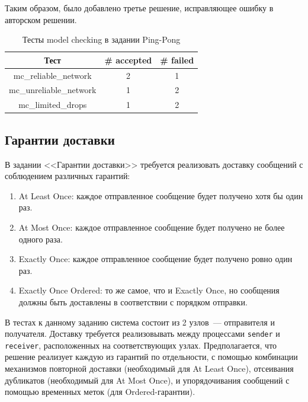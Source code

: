 \documentclass[a4paper,12pt]{extarticle}
\begin{document}
Таким образом, было добавлено третье решение, исправляющее ошибку в авторском решении.

\begin{table}[htbp]
    \caption{Тесты model checking в задании Ping-Pong}
    \begin{center}
    \begin{tabular}{|c|c|c|}
    \hline
    \textbf{Тест} & \textbf{\# accepted} & \textbf{\# failed}  \\
    \hline
    mc\_reliable\_network & 2 & 1 \\
    \hline
    mc\_unreliable\_network & 1 & 2 \\
    \hline
    mc\_limited\_drops & 1 &  2 \\
    \hline

    \end{tabular}
    \label{tab4}
    \end{center}
\end{table}


\subsection{Гарантии доставки}
\label{GUARANTEES}

В задании <<Гарантии доставки>> \cite{b13} требуется реализовать доставку сообщений с соблюдением различных гарантий:
\begin{enumerate}
\item At Least Once: каждое отправленное сообщение будет получено хотя бы один раз.
\item At Most Once: каждое отправленное сообщение будет получено не более одного раза.
\item Exactly Once: каждое отправленное сообщение будет получено ровно один раз.
\item Exactly Once Ordered: то же самое, что и Exactly Once, но сообщения должны быть доставлены в соответствии с порядком отправки.
\end{enumerate}

В тестах к данному заданию система состоит из 2 узлов~--- отправителя и получателя.
Доставку требуется реализовывать между процессами \texttt{sender} и \texttt{receiver}, расположенных на соответствующих узлах.
Предполагается, что решение реализует каждую из гарантий по отдельности, с помощью комбинации механизмов повторной доставки (необходимый для At Least Once), отсеивания дубликатов (необходимый для At Most Once), и упорядочивания сообщений с помощью временных меток (для Ordered-гарантии). 
\end{document}

